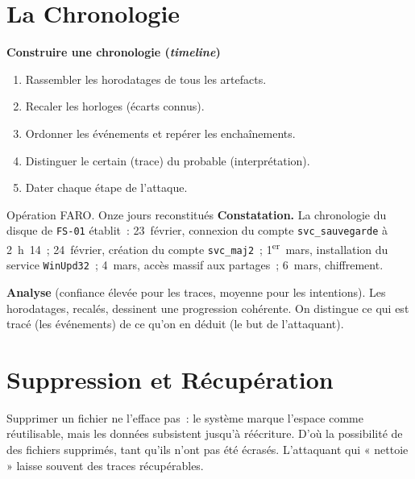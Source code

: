 \section{La Chronologie}
\label{sec:c12-chrono}

\begin{boxprocedure}
\textbf{Construire une chronologie (\textit{timeline})}
\begin{enumerate}
    \item Rassembler les horodatages de tous les artefacts.
    \item Recaler les horloges (écarts connus).
    \item Ordonner les événements et repérer les enchaînements.
    \item Distinguer le certain (trace) du probable (interprétation).
    \item Dater chaque étape de l'attaque.
\end{enumerate}
\end{boxprocedure}

\begin{boxscenario}{Opération FARO. Onze jours reconstitués}
\textbf{Constatation.} La chronologie du disque de \texttt{FS-01} établit~:
23~février, connexion du compte \texttt{svc\_sauvegarde} à 2~h~14~; 24~février,
création du compte \texttt{svc\_maj2}~; 1\textsuperscript{er}~mars,
installation du service \texttt{WinUpd32}~; 4~mars, accès massif aux
partages~; 6~mars, chiffrement.

\medskip
\textbf{Analyse} (confiance élevée pour les traces, moyenne pour les
intentions). Les horodatages, recalés, dessinent une progression cohérente.
On distingue ce qui est tracé (les événements) de ce qu'on en déduit (le but
de l'attaquant).
\end{boxscenario}

\section{Suppression et Récupération}
\label{sec:c12-suppression}

Supprimer un fichier ne l'efface pas~: le système marque l'espace comme
réutilisable, mais les données subsistent jusqu'à réécriture. D'où la
possibilité de  des fichiers supprimés, tant qu'ils n'ont
pas été écrasés. L'attaquant qui « nettoie » laisse souvent des traces
récupérables.

